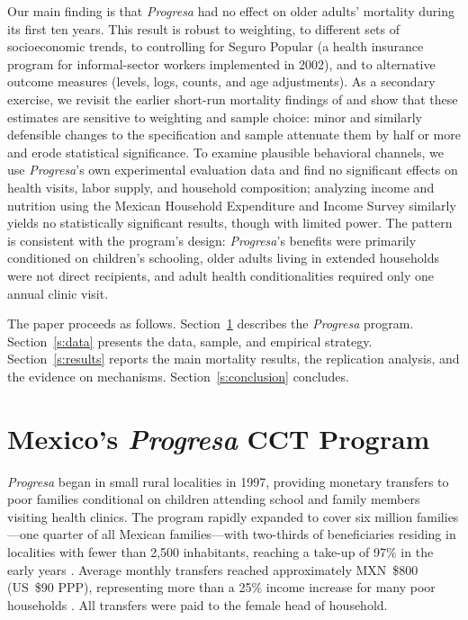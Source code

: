 \documentclass[12pt]{article}
\begin{document}
\p Our main finding is that \textit{Progresa} had no effect on older adults' mortality during its first ten years. This result is robust to weighting, to different sets of socioeconomic trends, to controlling for Seguro Popular (a health insurance program for informal-sector workers implemented in 2002), and to alternative outcome measures (levels, logs, counts, and age adjustments). As a secondary exercise, we revisit the earlier short-run mortality findings of \cite{BarhamRowberry2013JDE} and show that these estimates are sensitive to weighting and sample choice: minor and similarly defensible changes to the specification and sample attenuate them by half or more and erode statistical significance. To examine plausible behavioral channels, we use \textit{Progresa}'s own experimental evaluation data and find no significant effects on health visits, labor supply, and household composition; analyzing income and nutrition using the Mexican Household Expenditure and Income Survey similarly yields no statistically significant results, though with limited power. The pattern is consistent with the program's design: \textit{Progresa}'s benefits were primarily conditioned on children's schooling, older adults living in extended households were not direct recipients, and adult health conditionalities required only one annual clinic visit.

\p The paper proceeds as follows. Section~\ref{s:progresa} describes the \textit{Progresa} program. Section~\ref{s:data} presents the data, sample, and empirical strategy. Section~\ref{s:results} reports the main mortality results, the replication analysis, and the evidence on mechanisms. Section~\ref{s:conclusion} concludes.


\section{Mexico's \textit{Progresa} CCT Program}\label{s:progresa}

\p \textit{Progresa} began in small rural localities in 1997, providing monetary transfers to poor families conditional on children attending school and family members visiting health clinics. The program rapidly expanded to cover six million families—one quarter of all Mexican families—with two-thirds of beneficiaries residing in localities with fewer than 2,500 inhabitants, reaching a take-up of 97\% in the early years \citep{Fiszbein2009CCTBook, ParkerTodd2017JEL}. Average monthly transfers reached approximately MXN~\$800 (US~\$90 PPP), representing more than a 25\% income increase for many poor households \citep{Gertler2004AER, ParkerTodd2017JEL}. All transfers were paid to the female head of household.
\end{document}

